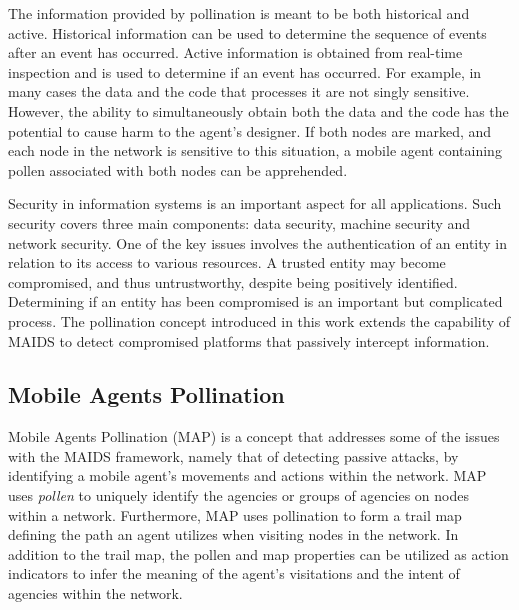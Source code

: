\documentclass{acm_proc_article-sp}
\begin{document}
The information provided by pollination is meant to be both historical and active.  Historical information can be used to determine the sequence of events after an event has occurred.  Active information is obtained from real-time inspection and is used to determine if an event has occurred.  For example, in many cases the data and the code that processes it are not singly sensitive.  However, the ability to simultaneously obtain both the data and the code has the potential to cause harm to the agent's designer.  If both nodes are marked, and each node in the network is sensitive to this situation, a mobile agent containing pollen associated with both nodes can be apprehended.

Security in information systems is an important aspect for all applications.  Such security covers three main components: data security, machine security and network security.  One of the key issues involves the authentication of an entity in relation to its access to various resources.  A trusted entity may become compromised, and thus untrustworthy, despite being positively identified.  Determining if an entity has been compromised is an important but complicated process.  The pollination concept introduced in this work extends the capability of MAIDS to detect compromised platforms that passively intercept information.

\subsection{Mobile Agents Pollination}
Mobile Agents Pollination (MAP) is a concept that addresses some of the issues with the MAIDS framework, namely that of detecting passive attacks, by identifying a mobile agent's movements and actions within the network.  MAP uses {\it pollen} to uniquely identify the agencies or groups of agencies on nodes within a network.  Furthermore, MAP uses pollination to form a trail map defining the path an agent utilizes when visiting nodes in the network.  In addition to the trail map, the pollen and map properties can be utilized as action indicators to infer the meaning of the agent's visitations and the intent of agencies within the network.
\end{document}
